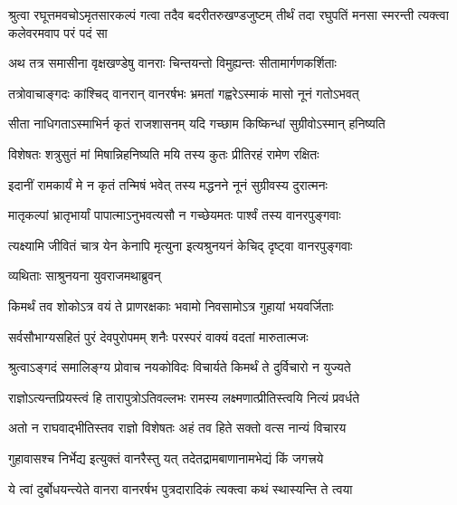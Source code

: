 \fourlineindentedshloka
{श्रुत्वा रघूत्तमवचोऽमृतसारकल्पं}
{गत्वा तदैव बदरीतरुखण्डजुष्टम्}
{तीर्थं तदा रघुपतिं मनसा स्मरन्ती}
{त्यक्त्वा कलेवरमवाप परं पदं सा} %






\twolineshloka
{अथ तत्र समासीना वृक्षखण्डेषु वानराः}
{चिन्तयन्तो विमुह्यन्तः सीतामार्गणकर्शिताः} %

\twolineshloka
{तत्रोवाचाङ्गदः कांश्चिद् वानरान् वानरर्षभः}
{भ्रमतां गह्वरेऽस्माकं मासो नूनं गतोऽभवत्} %

\twolineshloka
{सीता नाधिगताऽस्माभिर्न कृतं राजशासनम्}
{यदि गच्छाम किष्किन्धां सुग्रीवोऽस्मान् हनिष्यति} %

\twolineshloka
{विशेषतः शत्रुसुतं मां मिषान्निहनिष्यति}
{मयि तस्य कुतः प्रीतिरहं रामेण रक्षितः} %

\twolineshloka
{इदानीं रामकार्यं मे न कृतं तन्मिषं भवेत्}
{तस्य मद्धनने नूनं सुग्रीवस्य दुरात्मनः} %

\twolineshloka
{मातृकल्पां भ्रातृभार्यां पापात्माऽनुभवत्यसौ}
{न गच्छेयमतः पार्श्वं तस्य वानरपुङ्गवाः} %

\twolineshloka
{त्यक्ष्यामि जीवितं चात्र येन केनापि मृत्युना}
{इत्यश्रुनयनं केचिद् दृष्ट्वा वानरपुङ्गवाः} %

\onelineshloka
{व्यथिताः साश्रुनयना युवराजमथाब्रुवन्} %

\twolineshloka
{किमर्थं तव शोकोऽत्र वयं ते प्राणरक्षकाः}
{भवामो निवसामोऽत्र गुहायां भयवर्जिताः} %

\twolineshloka
{सर्वसौभाग्यसहितं पुरं देवपुरोपमम्}
{शनैः परस्परं वाक्यं वदतां मारुतात्मजः} %

\twolineshloka
{श्रुत्वाऽङ्गदं समालिङ्ग्य प्रोवाच नयकोविदः}
{विचार्यते किमर्थं ते दुर्विचारो न युज्यते} %

\twolineshloka
{राज्ञोऽत्यन्तप्रियस्त्वं हि तारापुत्रोऽतिवल्लभः}
{रामस्य लक्ष्मणात्प्रीतिस्त्वयि नित्यं प्रवर्धते} %

\twolineshloka
{अतो न राघवाद्भीतिस्तव राज्ञो विशेषतः}
{अहं तव हिते सक्तो वत्स नान्यं विचारय} %

\twolineshloka
{गुहावासश्च निर्भेद्य इत्युक्तं वानरैस्तु यत्}
{तदेतद्रामबाणानामभेद्यं किं जगत्त्रये} %

\twolineshloka
{ये त्वां दुर्बोधयन्त्येते वानरा वानरर्षभ}
{पुत्रदारादिकं त्यक्त्वा कथं स्थास्यन्ति ते त्वया} %

